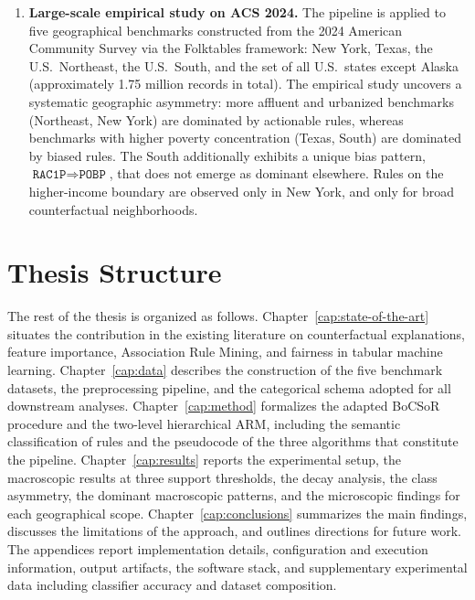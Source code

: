 \begin{enumerate}
  \item \textbf{Large-scale empirical study on ACS 2024.} The pipeline is applied to five geographical benchmarks constructed from the 2024 American Community Survey via the Folktables framework: New York, Texas, the U.S.\ Northeast, the U.S.\ South, and the set of all U.S.\ states except Alaska (approximately 1.75 million records in total). The empirical study uncovers a systematic geographic asymmetry: more affluent and urbanized benchmarks (Northeast, New York) are dominated by actionable rules, whereas benchmarks with higher poverty concentration (Texas, South) are dominated by biased rules. The South additionally exhibits a unique bias pattern, $\texttt{RAC1P} \Rightarrow \texttt{POBP}$, that does not emerge as dominant elsewhere. Rules on the higher-income boundary are observed only in New York, and only for broad counterfactual neighborhoods.
\end{enumerate}

\section{Thesis Structure}
\label{sec:intro-structure}

The rest of the thesis is organized as follows. Chapter~\ref{cap:state-of-the-art} situates the contribution in the existing literature on counterfactual explanations, feature importance, Association Rule Mining, and fairness in tabular machine learning. Chapter~\ref{cap:data} describes the construction of the five benchmark datasets, the preprocessing pipeline, and the categorical schema adopted for all downstream analyses. Chapter~\ref{cap:method} formalizes the adapted BoCSoR procedure and the two-level hierarchical ARM, including the semantic classification of rules and the pseudocode of the three algorithms that constitute the pipeline. Chapter~\ref{cap:results} reports the experimental setup, the macroscopic results at three support thresholds, the decay analysis, the class asymmetry, the dominant macroscopic patterns, and the microscopic findings for each geographical scope. Chapter~\ref{cap:conclusions} summarizes the main findings, discusses the limitations of the approach, and outlines directions for future work. The appendices report implementation details, configuration and execution information, output artifacts, the software stack, and supplementary experimental data including classifier accuracy and dataset composition.